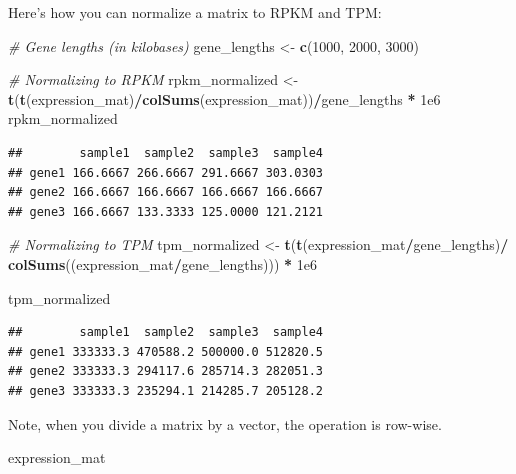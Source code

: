 \documentclass[
]{book}
\newenvironment{Shaded}{\begin{snugshade}}{\end{snugshade}}
\newcommand{\CommentTok}[1]{\textcolor[rgb]{0.56,0.35,0.01}{\textit{#1}}}
\newcommand{\DecValTok}[1]{\textcolor[rgb]{0.00,0.00,0.81}{#1}}
\newcommand{\FloatTok}[1]{\textcolor[rgb]{0.00,0.00,0.81}{#1}}
\newcommand{\FunctionTok}[1]{\textcolor[rgb]{0.13,0.29,0.53}{\textbf{#1}}}
\newcommand{\NormalTok}[1]{#1}
\newcommand{\OtherTok}[1]{\textcolor[rgb]{0.56,0.35,0.01}{#1}}
\newcommand{\SpecialCharTok}[1]{\textcolor[rgb]{0.81,0.36,0.00}{\textbf{#1}}}
\begin{document}
Here's how you can normalize a matrix to RPKM and TPM:

\begin{Shaded}
\begin{Highlighting}[]
\CommentTok{\# Gene lengths (in kilobases)}
\NormalTok{gene\_lengths }\OtherTok{\textless{}{-}} \FunctionTok{c}\NormalTok{(}\DecValTok{1000}\NormalTok{, }\DecValTok{2000}\NormalTok{, }\DecValTok{3000}\NormalTok{)}

\CommentTok{\# Normalizing to RPKM}
\NormalTok{rpkm\_normalized }\OtherTok{\textless{}{-}} \FunctionTok{t}\NormalTok{(}\FunctionTok{t}\NormalTok{(expression\_mat)}\SpecialCharTok{/}\FunctionTok{colSums}\NormalTok{(expression\_mat))}\SpecialCharTok{/}\NormalTok{gene\_lengths }\SpecialCharTok{*} \FloatTok{1e6}
\NormalTok{rpkm\_normalized}
\end{Highlighting}
\end{Shaded}

\begin{verbatim}
##        sample1  sample2  sample3  sample4
## gene1 166.6667 266.6667 291.6667 303.0303
## gene2 166.6667 166.6667 166.6667 166.6667
## gene3 166.6667 133.3333 125.0000 121.2121
\end{verbatim}

\begin{Shaded}
\begin{Highlighting}[]
\CommentTok{\# Normalizing to TPM}
\NormalTok{tpm\_normalized }\OtherTok{\textless{}{-}} \FunctionTok{t}\NormalTok{(}\FunctionTok{t}\NormalTok{(expression\_mat}\SpecialCharTok{/}\NormalTok{gene\_lengths)}\SpecialCharTok{/} \FunctionTok{colSums}\NormalTok{((expression\_mat}\SpecialCharTok{/}\NormalTok{gene\_lengths))) }\SpecialCharTok{*} \FloatTok{1e6}

\NormalTok{tpm\_normalized}
\end{Highlighting}
\end{Shaded}

\begin{verbatim}
##        sample1  sample2  sample3  sample4
## gene1 333333.3 470588.2 500000.0 512820.5
## gene2 333333.3 294117.6 285714.3 282051.3
## gene3 333333.3 235294.1 214285.7 205128.2
\end{verbatim}

Note, when you divide a matrix by a vector, the operation is row-wise.

\begin{Shaded}
\begin{Highlighting}[]
\NormalTok{expression\_mat}
\end{Highlighting}
\end{Shaded}
\end{document}
